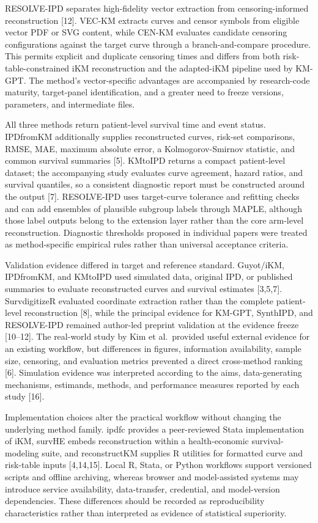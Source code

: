 \documentclass[
  english,
  letterpaper,
  DIV=11,
  numbers=noendperiod]{scrartcl}
\begin{document}
RESOLVE-IPD separates high-fidelity vector extraction from
censoring-informed reconstruction {[}12{]}. VEC-KM extracts curves and
censor symbols from eligible vector PDF or SVG content, while CEN-KM
evaluates candidate censoring configurations against the target curve
through a branch-and-compare procedure. This permits explicit and
duplicate censoring times and differs from both risk-table-constrained
iKM reconstruction and the adapted-iKM pipeline used by KM-GPT. The
method's vector-specific advantages are accompanied by research-code
maturity, target-panel identification, and a greater need to freeze
versions, parameters, and intermediate files.

All three methods return patient-level survival time and event status.
IPDfromKM additionally supplies reconstructed curves, risk-set
comparisons, RMSE, MAE, maximum absolute error, a Kolmogorov-Smirnov
statistic, and common survival summaries {[}5{]}. KMtoIPD returns a
compact patient-level dataset; the accompanying study evaluates curve
agreement, hazard ratios, and survival quantiles, so a consistent
diagnostic report must be constructed around the output {[}7{]}.
RESOLVE-IPD uses target-curve tolerance and refitting checks and can add
ensembles of plausible subgroup labels through MAPLE, although those
label outputs belong to the extension layer rather than the core
arm-level reconstruction. Diagnostic thresholds proposed in individual
papers were treated as method-specific empirical rules rather than
universal acceptance criteria.

Validation evidence differed in target and reference standard.
Guyot/iKM, IPDfromKM, and KMtoIPD used simulated data, original IPD, or
published summaries to evaluate reconstructed curves and survival
estimates {[}3,5,7{]}. SurvdigitizeR evaluated coordinate extraction
rather than the complete patient-level reconstruction {[}8{]}, while the
principal evidence for KM-GPT, SynthIPD, and RESOLVE-IPD remained
author-led preprint validation at the evidence freeze {[}10--12{]}. The
real-world study by Kim et al.~provided useful external evidence for an
existing workflow, but differences in figures, information availability,
sample size, censoring, and evaluation metrics prevented a direct
cross-method ranking {[}6{]}. Simulation evidence was interpreted
according to the aims, data-generating mechanisms, estimands, methods,
and performance measures reported by each study {[}16{]}.

Implementation choices alter the practical workflow without changing the
underlying method family. ipdfc provides a peer-reviewed Stata
implementation of iKM, survHE embeds reconstruction within a
health-economic survival-modeling suite, and reconstructKM supplies R
utilities for formatted curve and risk-table inputs {[}4,14,15{]}. Local
R, Stata, or Python workflows support versioned scripts and offline
archiving, whereas browser and model-assisted systems may introduce
service availability, data-transfer, credential, and model-version
dependencies. These differences should be recorded as reproducibility
characteristics rather than interpreted as evidence of statistical
superiority.
\end{document}
